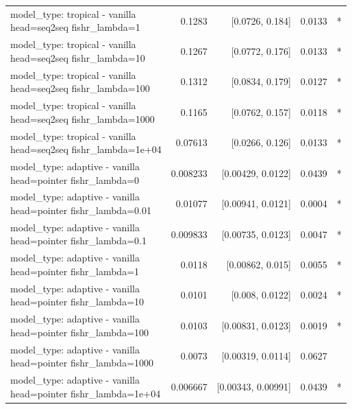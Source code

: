 \documentclass[10pt]{article}
\makeatletter
\newcommand{\stackcell}[1]{\begin{tabular}[t]{@{}l@{}}#1\end{tabular}}
\makeatother
\begin{document}
{\begin{longtable}{lrrrl}
\stackcell{model\_type: tropical - vanilla\\\footnotesize head=seq2seq fishr\_lambda=1 } & 0.1283 & [0.0726, 0.184] & 0.0133 & *\\
\stackcell{model\_type: tropical - vanilla\\\footnotesize head=seq2seq fishr\_lambda=10 } & 0.1267 & [0.0772, 0.176] & 0.0133 & *\\
\stackcell{model\_type: tropical - vanilla\\\footnotesize head=seq2seq fishr\_lambda=100 } & 0.1312 & [0.0834, 0.179] & 0.0127 & *\\
\stackcell{model\_type: tropical - vanilla\\\footnotesize head=seq2seq fishr\_lambda=1000 } & 0.1165 & [0.0762, 0.157] & 0.0118 & *\\
\stackcell{model\_type: tropical - vanilla\\\footnotesize head=seq2seq fishr\_lambda=1e+04 } & 0.07613 & [0.0266, 0.126] & 0.0133 & *\\
\stackcell{model\_type: adaptive - vanilla\\\footnotesize head=pointer fishr\_lambda=0 } & 0.008233 & [0.00429, 0.0122] & 0.0439 & *\\
\stackcell{model\_type: adaptive - vanilla\\\footnotesize head=pointer fishr\_lambda=0.01 } & 0.01077 & [0.00941, 0.0121] & 0.0004 & *\\
\stackcell{model\_type: adaptive - vanilla\\\footnotesize head=pointer fishr\_lambda=0.1 } & 0.009833 & [0.00735, 0.0123] & 0.0047 & *\\
\stackcell{model\_type: adaptive - vanilla\\\footnotesize head=pointer fishr\_lambda=1 } & 0.0118 & [0.00862, 0.015] & 0.0055 & *\\
\stackcell{model\_type: adaptive - vanilla\\\footnotesize head=pointer fishr\_lambda=10 } & 0.0101 & [0.008, 0.0122] & 0.0024 & *\\
\stackcell{model\_type: adaptive - vanilla\\\footnotesize head=pointer fishr\_lambda=100 } & 0.0103 & [0.00831, 0.0123] & 0.0019 & *\\
\stackcell{model\_type: adaptive - vanilla\\\footnotesize head=pointer fishr\_lambda=1000 } & 0.0073 & [0.00319, 0.0114] & 0.0627 & \\
\stackcell{model\_type: adaptive - vanilla\\\footnotesize head=pointer fishr\_lambda=1e+04 } & 0.006667 & [0.00343, 0.00991] & 0.0439 & *\\

\end{longtable}}
\end{document}

